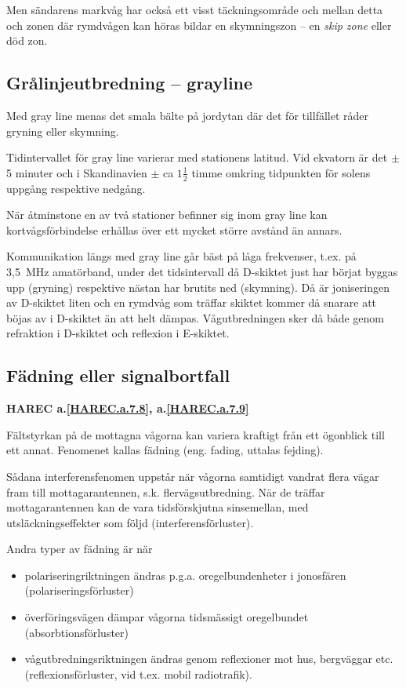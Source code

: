 Men sändarens markvåg har också ett visst täckningsområde och mellan
detta och zonen där rymdvågen kan höras bildar en skymningszon -- en
\emph{skip zone} eller död zon.

\subsection{Grålinjeutbredning -- grayline}

Med gray line menas det smala bälte på jordytan där det för tillfället
råder gryning eller skymning.

Tidintervallet för gray line varierar med stationens latitud. Vid
ekvatorn är det \(\pm\) 5 minuter och i Skandinavien \(\pm\) ca
\(1\frac{1}{2}\) timme omkring tidpunkten för solens uppgång
respektive nedgång.

När åtminstone en av två stationer befinner sig inom gray line kan
kortvågsförbindelse erhållas över ett mycket större avstånd än annars.

Kommunikation längs med gray line går bäst på låga frekvenser,
t.ex. på 3,5~MHz amatörband, under det tidsintervall då D-skiktet just
har börjat byggas upp (gryning) respektive nästan har brutits ned
(skymning). Då är joniseringen av D-skiktet liten och en rymdvåg som
träffar skiktet kommer då snarare att böjas av i D-skiktet än att helt
dämpas. Vågutbredningen sker då både genom refraktion i D-skiktet och
reflexion i E-skiktet.

\subsection{Fädning eller signalbortfall}
\textbf{
HAREC a.\ref{HAREC.a.7.8}\label{myHAREC.a.7.8},
 a.\ref{HAREC.a.7.9}\label{myHAREC.a.7.9}
}

Fältstyrkan på de mottagna vågorna kan variera kraftigt från ett
ögonblick till ett annat. Fenomenet kallas fädning (eng. fading,
uttalas fejding).

Sådana interferensfenomen uppstår när vågorna samtidigt vandrat flera
vägar fram till mottagarantennen, s.k. flervägsutbredning. När de
träffar mottagarantennen kan de vara tidsförskjutna sinsemellan, med
utsläckningseffekter som följd (interferensförluster).

Andra typer av fädning är när
\begin{itemize}
\item polariseringriktningen ändras p.g.a. oregelbundenheter i
  jonosfären (polariseringsförluster)
\item överföringsvägen dämpar vågorna tidsmässigt oregelbundet
  (absorbtionsförluster)
\item vågutbredningsriktningen ändras genom reflexioner mot hus,
  bergväggar etc. (reflexionsförluster, vid t.ex. mobil radiotrafik).
\end{itemize}


